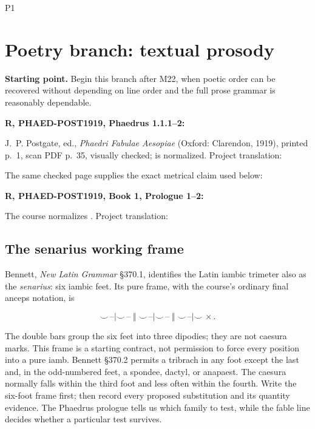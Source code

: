 

\begin{courseunit}{P1}
\chapter{Poetry branch: textual prosody}

\textbf{Starting point.} Begin this branch after M22, when poetic
order can be recovered without depending on line order and the full prose
grammar is reasonably dependable.

\textbf{R, PHAED-POST1919, Phaedrus 1.1.1--2:}
\begin{quote}
\end{quote}

J.~P. Postgate, ed., \textit{Phaedri Fabulae Aesopiae} (Oxford: Clarendon,
1919), printed p.~1, scan PDF p.~35, visually checked;  is
normalized. Project translation: 

The same checked page supplies the exact metrical claim used below:

\textbf{R, PHAED-POST1919, Book 1, Prologue 1--2:}
\begin{quote}
\PoetryPhaedrusPrologueOpening
\end{quote}

The course normalizes . Project translation: 

\section{The senarius working frame}

Bennett, \textit{New Latin Grammar} \S370.1, identifies the Latin iambic
trimeter also as the \emph{senarius}: six iambic feet. Its pure frame, with
the course's ordinary final anceps notation, is

\[
\smile\,\text{--}\mid
\smile\,\text{--}\;\Vert\;
\smile\,\text{--}\mid
\smile\,\text{--}\;\Vert\;
\smile\,\text{--}\mid
\smile\,\times .
\]

The double bars group the six feet into three dipodies; they are not caesura
marks.
This frame is a starting contract, not permission to force every position
into a pure iamb. Bennett \S370.2 permits a tribrach in any foot except the
last and, in the odd-numbered feet, a spondee, dactyl, or anapaest. The caesura
normally falls within the third foot and less often within the fourth. Write
the six-foot frame first; then record every proposed substitution and its
quantity evidence. The Phaedrus prologue tells us which family to test, while
the fable line decides whether a particular test survives.


\end{courseunit}
